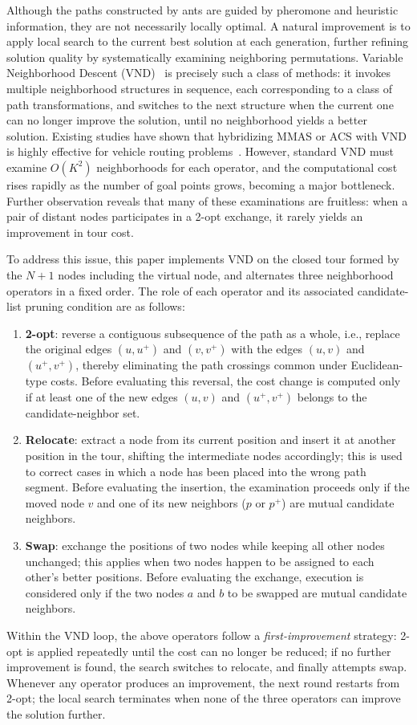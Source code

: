 Although the paths constructed by ants are guided by pheromone and heuristic information, they are not necessarily locally optimal. A natural improvement is to apply local search to the current best solution at each generation, further refining solution quality by systematically examining neighboring permutations. Variable Neighborhood Descent (VND)~\textcolor{blue}{\cite{ref24}} is precisely such a class of methods: it invokes multiple neighborhood structures in sequence, each corresponding to a class of path transformations, and switches to the next structure when the current one can no longer improve the solution, until no neighborhood yields a better solution. Existing studies have shown that hybridizing MMAS or ACS with VND is highly effective for vehicle routing problems~\textcolor{blue}{\cite{ref25}}. However, standard VND must examine $O(K^2)$ neighborhoods for each operator, and the computational cost rises rapidly as the number of goal points grows, becoming a major bottleneck. Further observation reveals that many of these examinations are fruitless: when a pair of distant nodes participates in a 2-opt exchange, it rarely yields an improvement in tour cost.

To address this issue, this paper implements VND on the closed tour formed by the $N+1$ nodes including the virtual node, and alternates three neighborhood operators in a fixed order. The role of each operator and its associated candidate-list pruning condition are as follows:
\begin{enumerate}
\item \textbf{2-opt}: reverse a contiguous subsequence of the path as a whole, i.e., replace the original edges $(u, u^{+})$ and $(v, v^{+})$ with the edges $(u, v)$ and $(u^{+}, v^{+})$, thereby eliminating the path crossings common under Euclidean-type costs. Before evaluating this reversal, the cost change is computed only if at least one of the new edges $(u, v)$ and $(u^{+}, v^{+})$ belongs to the candidate-neighbor set.
\item \textbf{Relocate}: extract a node from its current position and insert it at another position in the tour, shifting the intermediate nodes accordingly; this is used to correct cases in which a node has been placed into the wrong path segment. Before evaluating the insertion, the examination proceeds only if the moved node $v$ and one of its new neighbors ($p$ or $p^{+}$) are mutual candidate neighbors.
\item \textbf{Swap}: exchange the positions of two nodes while keeping all other nodes unchanged; this applies when two nodes happen to be assigned to each other's better positions. Before evaluating the exchange, execution is considered only if the two nodes $a$ and $b$ to be swapped are mutual candidate neighbors.
\end{enumerate}
Within the VND loop, the above operators follow a \emph{first-improvement} strategy: 2-opt is applied repeatedly until the cost can no longer be reduced; if no further improvement is found, the search switches to relocate, and finally attempts swap. Whenever any operator produces an improvement, the next round restarts from 2-opt; the local search terminates when none of the three operators can improve the solution further.

